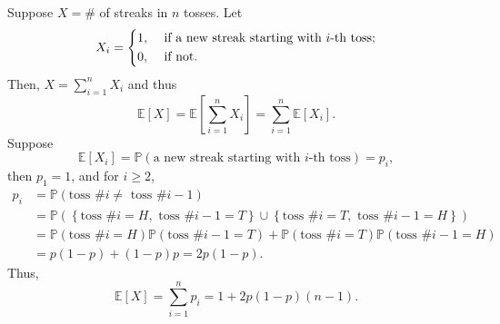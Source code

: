 \begin{explanation}
    Suppose \(X = \#\) of streaks in \(n\) tosses. Let
    \[
        X_i = \begin{dcases}
            1, &\text{ if a new streak starting with } i\text{-th toss};\\
            0, &\text{ if not}.
        \end{dcases}
    \] 
    Then, \(X = \sum_{i=1}^n X_i \) and thus
    \[
        \mathbb{E} [X] = \mathbb{E} \left[ \sum_{i=1}^n X_i  \right] = \sum_{i=1}^n \mathbb{E} [X_i].  
    \] 
    Suppose
    \[
        \mathbb{E} [X_i] = \mathbb{P} (\text{a new streak starting with } i\text{-th toss}) = p_i,
    \]
    then \(p_1 = 1\), and for \(i \ge 2\), 
    \begin{align*}
        p_i &= \mathbb{P} (\text{toss \# } i \neq \text{ toss \# } i - 1) \\
            &= \mathbb{P} \left( \left\{ \text{toss \# } i = H, \text{ toss \#} i - 1 = T   \right\} \cup \left\{ \text{toss \# } i = T, \text{ toss \#} i - 1 = H   \right\}  \right) \\
            &= \mathbb{P} (\text{toss \# } i = H) \mathbb{P} (\text{toss \# } i - 1 = T) + \mathbb{P} (\text{toss \# } i = T) \mathbb{P} (\text{toss \# } i - 1 = H) \\
            &= p(1 - p) + (1 - p)p = 2p(1 - p). 
    \end{align*}  
    Thus, 
    \[
        \mathbb{E} [X] = \sum_{i=1}^n p_i = 1 + 2p(1 - p)(n - 1). 
    \]
\end{explanation}